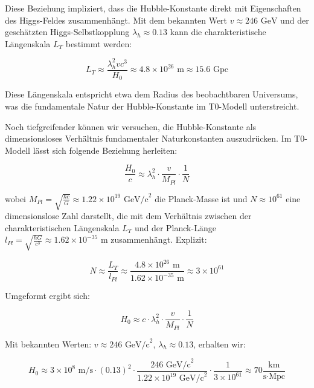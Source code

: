 \documentclass[a4paper,12pt]{article}
\theoremstyle{definition}
\theoremstyle{remark}
\begin{document}
	Diese Beziehung impliziert, dass die Hubble-Konstante direkt mit Eigenschaften des Higgs-Feldes zusammenhängt. Mit dem bekannten Wert $v \approx 246 \text{ GeV}$ und der geschätzten Higgs-Selbstkopplung $\lambda_h \approx 0.13$ kann die charakteristische Längenskala $L_T$ bestimmt werden:
	
	\begin{equation}
		L_T \approx \frac{\lambda_h^2 v c^3}{H_0} \approx 4.8 \times 10^{26} \text{ m} \approx 15.6 \text{ Gpc}
	\end{equation}
	
	Diese Längenskala entspricht etwa dem Radius des beobachtbaren Universums, was die fundamentale Natur der Hubble-Konstante im T0-Modell unterstreicht.
	
	Noch tiefgreifender können wir versuchen, die Hubble-Konstante als dimensionsloses Verhältnis fundamentaler Naturkonstanten auszudrücken. Im T0-Modell lässt sich folgende Beziehung herleiten:
	
	\begin{equation}
		\frac{H_0}{c} \approx \lambda_h^2 \cdot \frac{v}{M_{Pl}} \cdot \frac{1}{N}
	\end{equation}
	
	wobei $M_{Pl} = \sqrt{\frac{\hbar c}{G}} \approx 1.22 \times 10^{19} \text{ GeV/c}^2$ die Planck-Masse ist und $N \approx 10^{61}$ eine dimensionslose Zahl darstellt, die mit dem Verhältnis zwischen der charakteristischen Längenskala $L_T$ und der Planck-Länge $l_{Pl} = \sqrt{\frac{\hbar G}{c^3}} \approx 1.62 \times 10^{-35} \text{ m}$ zusammenhängt. Explizit:
	
	\begin{equation}
		N \approx \frac{L_T}{l_{Pl}} \approx \frac{4.8 \times 10^{26} \text{ m}}{1.62 \times 10^{-35} \text{ m}} \approx 3 \times 10^{61}
	\end{equation}
	
	Umgeformt ergibt sich:
	
	\begin{equation}
		H_0 \approx c \cdot \lambda_h^2 \cdot \frac{v}{M_{Pl}} \cdot \frac{1}{N}
	\end{equation}
	
	Mit bekannten Werten: $v \approx 246 \text{ GeV/c}^2$, $\lambda_h \approx 0.13$, erhalten wir:
	
	\begin{equation}
		H_0 \approx 3 \times 10^8 \text{ m/s} \cdot (0.13)^2 \cdot \frac{246 \text{ GeV/c}^2}{1.22 \times 10^{19} \text{ GeV/c}^2} \cdot \frac{1}{3 \times 10^{61}} \approx 70 \frac{\text{km}}{\text{s} \cdot \text{Mpc}}
	\end{equation}
	
\end{document}
